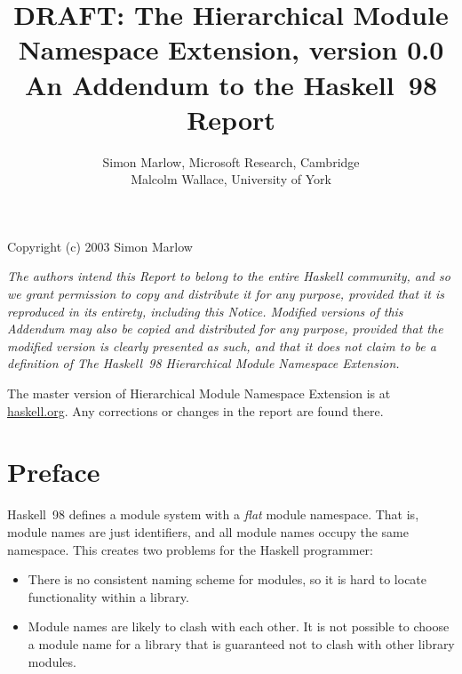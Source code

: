 \documentclass[a4paper,twoside]{article}
\newcommand{\clearemptydoublepage}{%
  \newpage{\pagestyle{empty}\cleardoublepage}}
\begin{document}
\makeatactive

\title{%
  DRAFT: The Hierarchical Module Namespace Extension, version 0.0\\
  An Addendum to the Haskell~98 Report%
}
\author{
  Simon Marlow, Microsoft Research, Cambridge\\
  Malcolm Wallace, University of York
}

\date{}
\maketitle
\par\vfill
\noindent
Copyright (c) 2003 Simon Marlow
\par\noindent
\emph{The authors intend this Report to belong to the entire Haskell
community, and so we grant permission to copy and distribute it for
any purpose, provided that it is reproduced in its entirety, including
this Notice.  Modified versions of this Addendum may also be copied
and distributed for any purpose, provided that the modified version is
clearly presented as such, and that it does not claim to be a
definition of The Haskell~98 Hierarchical
Module Namespace Extension.}

\par\bigskip\noindent The master version of Hierarchical Module
Namespace Extension is at \url{haskell.org}. Any corrections or
changes in the report are found there.
\thispagestyle{empty}

\clearemptydoublepage
{}

\clearemptydoublepage
\section*{Preface}

Haskell~98 defines a module system with a \emph{flat} module
namespace.  That is, module names are just identifiers, and all module
names occupy the same namespace.  This creates two problems for the
Haskell programmer: 

\begin{itemize}
\item
  There is no consistent naming scheme for modules, so it is hard to
  locate functionality within a library.

\item
  Module names are likely to clash with each other.  It is not
  possible to choose a module name for a library that is guaranteed
  not to clash with other library modules.
\end{itemize}
\end{document}
